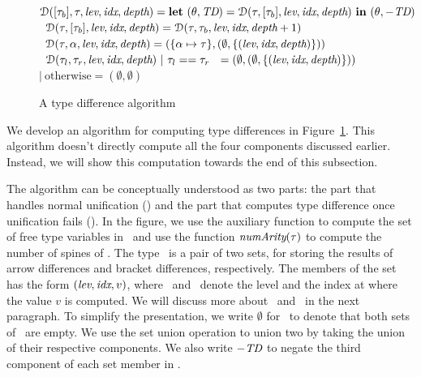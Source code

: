 \documentclass[12pt]{report}	%
\begin{document}
\begin{figure}
\begin{minipage}{1\columnwidth}
\begin{qprogram}
%
\namevg\ $\mathcal D([\tau_b],\tau,\textit{lev},\textit{idx},\textit{depth}) =
        \textbf{let}\ (\theta,\textit{TD}) = \mathcal D(\tau,[\tau_b],\textit{lev},\textit{idx},\textit{depth})\
        \textbf{in}\ (\theta,-\textit{TD}) $ \\[3pt]
%
\namevh\ $\mathcal D(\tau,[\tau_b],\textit{lev},\textit{idx},\textit{depth}) = \mathcal D(\tau,\tau_b,\textit{lev},\textit{idx},\textit{depth}+1) $ \\[3pt]
\namevi\ $\dalg(\mt,\tv,\level,\idx,\depth) = (\set{\map{\tv}{\mt}},(\emptyset,\set{(\level,\idx,\depth)})) $ \\[3pt]
%
%
\namevj\ $\dalg(\mt_l,\mt_r,\level,\idx,\depth)\ |\ \mt_l == \mt_r\ \  =
(\emptyset,(\emptyset,\set{(\level,\idx,\depth)})) $ \\
\phantom{\namevj\ $\dalg(\level,\idx,\depth,\mt_l,\mt_r)$}
    $|\ \text{otherwise} = (\emptyset,\emptyset) $
%
\end{qprogram}
\end{minipage}
\caption{A type difference algorithm}
\label{fig:ualg}
\end{figure}

We develop an algorithm for computing type differences in Figure~\ref{fig:ualg}.
This algorithm doesn't directly compute all the four components
discussed earlier. Instead, we will show this computation towards the end
of this subsection.

The algorithm can be conceptually understood as two parts: the part
that handles normal unification (\ualg) and the part
that computes type difference once unification fails (\dalg).
%
In the
figure, we use the auxiliary function \FV{\mt} to compute the set of
free type variables in \mt\ and use the function $\textit{numArity}(\tau)$ to compute the
number of spines of \mt.
The type \td\ is a pair of two sets, for storing the results
of arrow differences and bracket differences, respectively. The members of the
set has the form $(\textit{lev},\textit{idx},v)$, where \level\ and
\idx\ denote the level and the index at where the value $v$ is computed.
We will discuss
more about \level\ and \idx\ in the next paragraph.
%
To simplify the presentation,
we write $\emptyset$ for \td\ to denote that both sets of \td\ are empty.
We use the set union operation to union two \td{s} by taking the union of their respective
components. We also write $-\textit{TD}$ to negate the third component of each
set member in \td.
\end{document}
